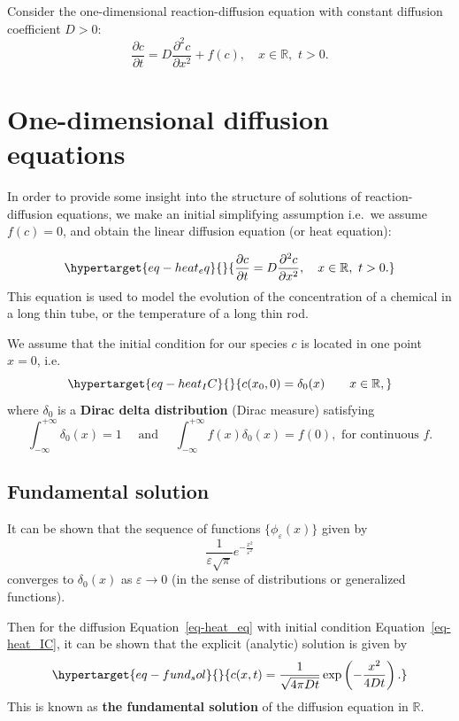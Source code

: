 \documentclass[
  letterpaper,
  DIV=11,
  numbers=noendperiod]{scrreprt}
\theoremstyle{definition}
\theoremstyle{plain}
\theoremstyle{plain}
\theoremstyle{remark}
\begin{document}
Consider the one-dimensional reaction-diffusion equation with constant
diffusion coefficient \(D > 0\): \[
\frac{\partial c}{\partial t} = D \frac{\partial^2 c}{\partial x^2}  + f(c), \quad x\in \mathbb R, \, \, t >0.
\]

\hypertarget{one-dimensional-diffusion-equations}{%
\section{One-dimensional diffusion
equations}\label{one-dimensional-diffusion-equations}}

In order to provide some insight into the structure of solutions of
reaction-diffusion equations, we make an initial simplifying assumption
i.e.~we assume \(f(c)=0\), and obtain the linear diffusion equation (or
heat equation):

\begin{equation}\protect\hypertarget{eq-heat_eq}{}{
\frac{\partial c}{\partial t} = D \frac{\partial^2 c}{\partial x^2},   \quad x\in \mathbb R, \, \, t >0.
}\label{eq-heat_eq}\end{equation} This equation is used to model the
evolution of the concentration of a chemical in a long thin tube, or the
temperature of a long thin rod.

We assume that the initial condition for our species \(c\) is located in
one point \(x=0\), i.e.~
\begin{equation}\protect\hypertarget{eq-heat_IC}{}{
c(x_0 , 0) = \delta_0(x)\qquad x \in \mathbb R, 
}\label{eq-heat_IC}\end{equation} where \(\delta_0\) is a \textbf{Dirac
delta distribution} (Dirac measure) satisfying \[
\int_{-\infty}^{+\infty} \delta_0(x) = 1 \quad \text{ and } \quad \int_{-\infty}^{+\infty} f(x) \delta_0(x) = f(0) , \text{ for continuous } f. 
\]

\hypertarget{fundamental-solution}{%
\subsection{Fundamental solution}\label{fundamental-solution}}

It can be shown that the sequence of functions
\(\{ \phi_\varepsilon(x) \}\) given by \[
\frac 1{\varepsilon \sqrt{\pi} } e^{ - \frac{x^2}{ \varepsilon^2}}
\] converges to \(\delta_0(x)\) as \(\varepsilon \to 0\) (in the sense
of distributions or generalized functions).

Then for the diffusion Equation~\ref{eq-heat_eq} with initial condition
Equation~\ref{eq-heat_IC}, it can be shown that the explicit (analytic)
solution is given by
\begin{equation}\protect\hypertarget{eq-fund_sol}{}{
c(x, t) = \frac1{\sqrt{4 \pi D t}} \exp \left( - \frac{ x^2}{ 4Dt} \right).
}\label{eq-fund_sol}\end{equation} This is known as \textbf{the
fundamental solution} of the diffusion equation in \(\mathbb R\).
\end{document}
